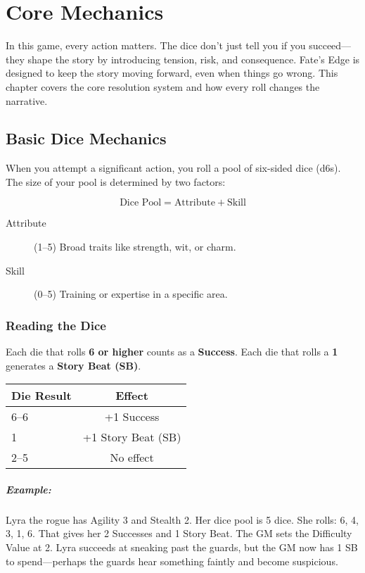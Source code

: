 \chapter{Core Mechanics} \label{ch:core-mechanics}

In this game, every action matters. The dice don't just tell you if you succeed—they shape the story by introducing tension, risk, and consequence. Fate's Edge is designed to keep the story moving forward, even when things go wrong. This chapter covers the core resolution system and how every roll changes the narrative.

\section{Basic Dice Mechanics} 

When you attempt a significant action, you roll a pool of six-sided dice (d6s). The size of your pool is determined by two factors:

\[
\text{Dice Pool} = \text{Attribute} + \text{Skill}
\]

\begin{description}
  \item[Attribute] (1--5) Broad traits like strength, wit, or charm. 
  \item[Skill] (0--5) Training or expertise in a specific area. 
\end{description}

\subsection*{Reading the Dice}

Each die that rolls \textbf{6 or higher} counts as a \textbf{Success}.  
Each die that rolls a \textbf{1} generates a \textbf{Story Beat (SB)}.

\begin{center}
\small
\begin{tabular}{lc}
\toprule
\textbf{Die Result} & \textbf{Effect} \\
\midrule
6--6 & +1 Success \\
1 & +1 Story Beat (SB) \\
2--5 & No effect \\
\bottomrule
\end{tabular}
\end{center}

\paragraph{Example:}  
Lyra the rogue has Agility 3 and Stealth 2. Her dice pool is 5 dice. She rolls: 6, 4, 3, 1, 6. That gives her 2 Successes and 1 Story Beat. The GM sets the Difficulty Value at 2. Lyra succeeds at sneaking past the guards, but the GM now has 1 SB to spend—perhaps the guards hear something faintly and become suspicious.


